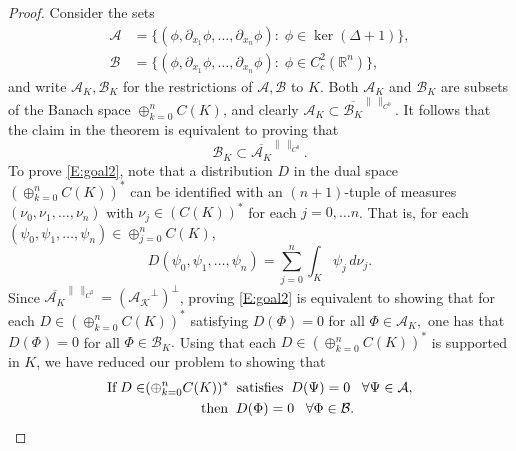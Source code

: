 \documentclass[11pt,reqno]{amsart}
\newcommand{\R}{{\mathbb R}}
\theoremstyle{definition}
\begin{document}
\begin{proof}
Consider the sets
\begin{align*}
\mathcal A&= \{(\phi, \partial_{x_1} \phi, \dots,  \partial_{x_n} \phi ):\; \phi \in \ker(\Delta+1)\},\\
\mathcal B&= \{(\phi, \partial_{x_1} \phi, \dots,  \partial_{x_n} \phi ):\; \phi \in C_c^2(\R^n)\},
\end{align*}
and write $\mathcal A_K, \mathcal B_K$ for the restrictions of $\mathcal A,\mathcal B$ to $K$.
Both  $\mathcal A_K$ and $\mathcal B_K$ are subsets of the Banach space $\oplus_{k=0}^n C(K)$, and clearly  $ \mathcal A_K\subset \overline{\mathcal B_K}^{\|\,\|_{C^0}}$. It follows that the claim in the theorem is equivalent to proving that 
\begin{equation}\label{E:goal2}
\mathcal B_K \subset  \overline{\mathcal A_K}^{\|\,\|_{C^0}} .
\end{equation}
To prove \eqref{E:goal2}, note that a distribution $D$ in the dual space $(\oplus_{k=0}^n C(K))^*$ can be identified with an $(n+1)$-tuple of measures $(\nu_0, \nu _1, \dots, \nu_n)$ with $\nu_j \in (C(K))^*$ for each $j=0, \dots n$. That is, for each $(\psi_0, \psi_1, \dots, \psi_n)\in \oplus_{j=0}^n C(K)$, 
\begin{equation}\label{E:D}
D(\psi_0, \psi_1, \dots, \psi_n)=  \sum_{j=0}^n \int_K  \psi_j \, d\nu_j.
\end{equation}
Since $\overline{\mathcal A_K}^{\|\,\|_{C^0}}=(\mathcal {A_K}^\perp )^\perp$, proving \eqref{E:goal2} is equivalent to showing that for each $D \in (\oplus_{k=0}^n C(K))^* $ satisfying
$D (\Phi ) =0 $ for all $\Phi \in \mathcal A_K,$
one has that
$D (\Phi ) =0 $ for all $\Phi \in \mathcal B_K.$ Using that each $D\in (\oplus_{k=0}^n C(K))^*$ is supported in $K$, we have reduced our problem to showing that 
\begin{align}\label{E:goal3}
\text{If}\;  D\in & (\oplus_{k=0}^n C(K))^*\; \; \text{satisfies} \;\;D (\Psi ) =0 \; \;\;\forall \Psi \in \mathcal A,\notag\\ &\qquad \qquad \text{then}\;\;D (\Phi ) =0 \; \;\;\forall \Phi \in \mathcal B.
\end{align}



\end{proof}
\end{document}
